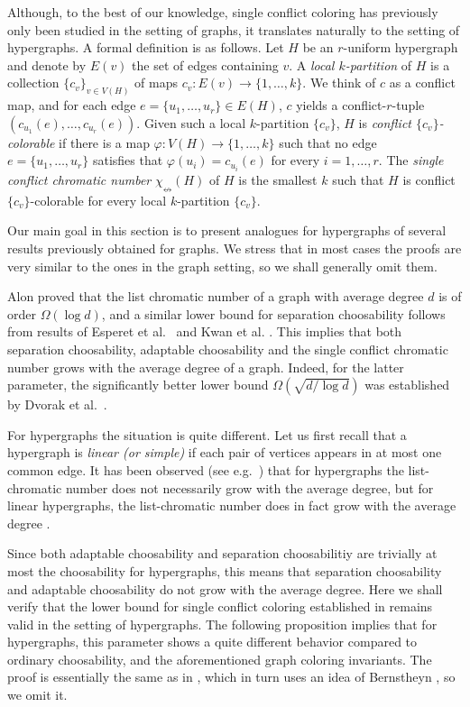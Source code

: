 \documentclass[12pt]{article}
\newcommand{\single}{\chi_{\nleftrightarrow}}
\newcommand{\1}{\mathds{1}}
\begin{document}
	Although, to the best of our knowledge,
	single conflict coloring has previously only been studied in the setting of graphs,
	it translates naturally to the setting of hypergraphs. 
	A formal definition is as follows.
	Let $H$ be an $r$-uniform 
	hypergraph and denote by $E(v)$ the set of edges containing $v$. 
	A {\em local $k$-partition} of $H$ is a collection $\{c_v\}_{v \in V(H)}$ of maps 
	$c_v : E(v) \to \{1,\dots, k\}$. We think of $c$ as a conflict map, and for each
	edge $e = \{u_1, \dots, u_r\} \in E(H)$, $c$ yields a conflict-$r$-tuple 
	$(c_{u_1}(e), \dots, c_{u_r}(e))$. Given such a local $k$-partition $\{c_v\}$,
	$H$ is {\em conflict $\{c_v\}$-colorable} if there is a map 
	$\varphi : V(H) \to \{1,\dots, k\}$ such that no edge $e = \{u_1, \dots, u_r\}$ 
	satisfies that $\varphi(u_i) = c_{u_i}(e)$ for every $i=1,\dots, r$.
	The {\em single conflict chromatic number} $\single(H)$ of 
	$H$ is the smallest $k$ such that
	$H$ is conflict $\{c_v\}$-colorable for every local $k$-partition $\{c_v\}$.
 	
	Our main goal in this section is to present analogues for hypergraphs of several results
	previously obtained for graphs. We stress that in most cases the proofs are very similar
	to the ones in the graph setting, so we shall generally omit them.

	
	Alon \cite{Alon} proved that the list chromatic number of a graph with average
	degree $d$ is of order $\Omega(\log d)$, and a similar lower bound for separation choosability
	follows from results of 
	Esperet et al.~\cite{EsperetKangThomasse} and Kwan et al. \cite{Kwan}.
		This implies that both separation choosability, adaptable choosability and
	the single conflict chromatic number grows with the average degree of a graph.
	Indeed, for the latter parameter, the significantly better lower bound
	$\Omega(\sqrt{d/\log d})$ was established by Dvorak et al.~\cite{DvorakEsperetKangOzeki}.

	For hypergraphs the situation is quite different.	
	Let us first recall that a hypergraph is {\em linear (or simple)} if each pair of vertices
	appears in at most one common edge. It has been observed (see e.g.\ 
	\cite{SaxtonThomason}) that for hypergraphs the
	list-chromatic number does not necessarily grow with the average degree, but for
	linear hypergraphs, the list-chromatic number does in fact grow with
	the average degree \cite{AlonKostochka, SaxtonThomason}.

	Since both adaptable choosability and separation choosabilitiy are
	trivially at most the choosability for hypergraphs, this means that separation choosability and adaptable
	choosability do not grow
	with the average degree. Here we shall verify that the lower bound for single conflict
	coloring established in  \cite{DvorakEsperetKangOzeki} remains valid in the
	setting of hypergraphs. The following proposition implies that for hypergraphs, 
	this parameter shows a
	quite different behavior compared to ordinary choosability, and the aforementioned
	graph coloring invariants. The proof is essentially the
	same as in \cite{DvorakEsperetKangOzeki}, which in turn uses an idea
	of Bernstheyn \cite{Bernstheyn}, so we omit it.
\end{document}
